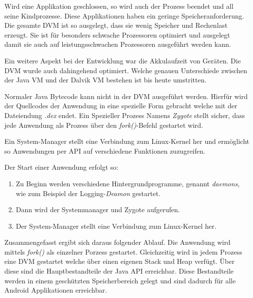 Wird eine Applikation geschlossen, so wird auch der Prozess beendet und all seine Kindprozesse. Diese Applikationen haben ein geringe Speicheranforderung. Die gesamte DVM ist so ausgelegt, dass sie wenig Speicher und Rechenlast erzeugt. Sie ist für besonders schwache Prozessoren optimiert und ausgelegt damit sie auch auf leistungsschwachen Prozessoren ausgeführt werden kann.

Ein weitere Aspekt bei der Entwicklung war die Akkulaufzeit von Geräten. Die DVM wurde auch dahingehend optimiert. Welche genauen Unterschiede zwischen der Java VM und der Dalvik VM bestehen ist bis heute umstritten\cite{news_2}.

Normaler Java Bytecode kann nicht in der DVM ausgeführt werden. Hierfür wird der Quellcodes der Anwendung in eine spezielle Form gebracht welche mit der Dateiendung \textit{.dex} endet. Ein Spezieller Prozess Namens \textit{Zygote} stellt sicher, dass jede Anwendung als Prozess über den \textit{fork()}-Befehl gestartet wird.

Ein System-Manager stellt eine Verbindung zum Linux-Kernel her und ermöglicht so Anwendungen per API auf verschiedene Funktionen zuzugreifen.

Der Start einer Anwendung erfolgt so:

\begin{enumerate}
   \item Zu Beginn werden verschiedene Hintergrundprogramme, genannt \textit{daemons}, wie zum Beispiel der Logging-\textit{Deamon} gestartet.
   \item Dann wird der Systemmanager und Zygote aufgerufen.
   \item Der System-Manager stellt eine Verbindung zum Linux-Kernel her.
\end{enumerate}
 
 Zusammengefasst ergibt sich daraus folgender Ablauf. Die Anwendung wird mittels \textit{fork()} als einzelner Porzess gestartet. Gleichzeitig wird in jedem Prozess eine DVM gestartet welche über einen eigenen Stack und Heap verfügt. Über diese sind die Hauptbestandteile der Java API erreichbar. Diese Bestandteile werden in einem geschützten Speicherbereich gelegt und sind dadurch für alle Android Applikationen erreichbar.
 
